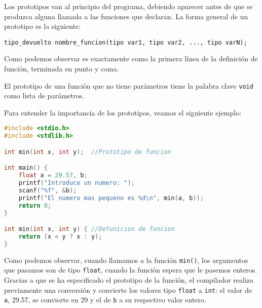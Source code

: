 Los prototipos van al principio del programa, debiendo aparecer antes de que se produzca alguna llamada a las funciones que declaran. La forma general de un prototipo es la siguiente:

\texttt{tipo\_devuelto nombre\_funcion(tipo var1, tipo var2, ..., tipo varN);}

Como podemos observar es exactamente como la primera línea de la definición de función, terminada en punto y coma.

El prototipo de una función que no tiene parámetros tiene la palabra clave \texttt{void} como lista de parámetros.

Para entender la importancia de los prototipos, veamos el siguiente ejemplo:
\begin{Ejemplo}
\begin{lstlisting}[language=C]
#include <stdio.h>
#include <stdlib.h>

int min(int x, int y);	//Prototipo de funcion

int main() {
    float a = 29.57, b;
    printf("Introduce un numero: ");
    scanf("%f", &b);
    printf("El numero mas pequeno es %d\n", min(a, b));
    return 0;
}

int min(int x, int y) {	//Defunicion de funcion
    return (x < y ? x : y);
}
\end{lstlisting}
\Explicacion
Como podemos observar, cuando llamamos a la función \texttt{min()}, los argumentos que pasamos son de tipo \texttt{float}, cuando la función espera que le pasemos enteros. Gracias a que se ha especificado el prototipo de la función, el compilador realiza previamente una conversión y convierte los valores tipo \texttt{float} a \texttt{int}: el valor de \texttt{a}, 29.57, se convierte en 29 y el de \texttt{b} a su respectivo valor entero.
\end{Ejemplo}
